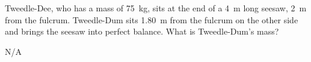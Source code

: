 \begin{question}[ID=torque-C-Q04,topic=torque,difficulty=C]
    Tweedle-Dee, who has a mass of \SI{75}{\kilo\gram}, sits
        at the end of a \SI{4}{\meter} long seesaw, \SI{2}{\meter}
        from the fulcrum.
    Tweedle-Dum sits \SI{1.80}{\meter} from the fulcrum
        on the other side and brings the seesaw into perfect balance.
    What is Tweedle-Dum's mass?
\end{question}
\begin{solution}
    N/A
\end{solution}


\endinput

